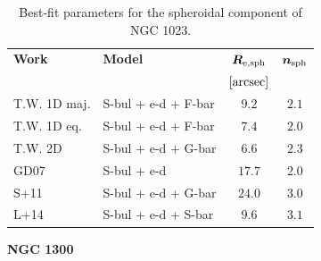 \documentclass[preprint2]{emulateapj}
\begin{document}
  \begin{table}[h]
  \small
  \caption{Best-fit parameters for the spheroidal component of NGC 1023.}
  \begin{center}
  \begin{tabular}{llcc}
  \hline
  {\bf Work} & {\bf Model}   & $\bm R_{\rm e,sph}$    & $\bm n_{\rm sph}$ \\
    &  &  $[\rm arcsec]$ & \\
  \hline
  T.W. 1D maj. & S-bul + e-d + F-bar & $9.2$  &  $2.1$ \\
  T.W. 1D eq.  & S-bul + e-d + F-bar & $7.4$  &  $2.0$ \\
  T.W. 2D      & S-bul + e-d + G-bar & $6.6$  &  $2.3$ \\
  \hline
  GD07    & S-bul + e-d 	& $17.7$  &  $2.0$ \\
  S+11    & S-bul + e-d + G-bar & $24.0$  &  $3.0$ \\
  L+14    & S-bul + e-d + S-bar & $9.6$   &  $3.1$ \\
  \hline
  \end{tabular}
  \end{center}
  \label{tab:n1023}
  \end{table}



  \clearpage\newpage\noindent
  {\bf NGC 1300 \\}
  
\end{document}
